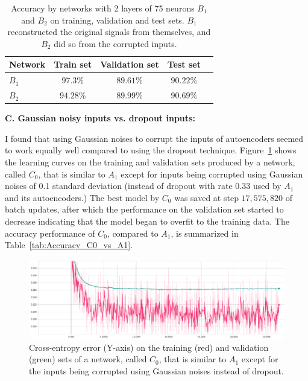 \documentclass[12pt]{article}
\begin{document}
\begin{table}
\begin{center}
\begin{tabular}{|l||c|c|c|l|}
\hline
Network & Train set & Validation set & Test set\\ \hline \hline
$B_1$ & $97.3\%$ & $89.61\%$ & $90.22\%$\\ \hline
$B_2$ & $94.28\%$ & $89.99\%$ & $90.69\%$\\ \hline
\end{tabular}
\caption{Accuracy by networks with 2 layers of 75 neurons $B_1$ and $B_2$ on training, validation and test sets. $B_1$ reconstructed the original signals from themselves, and $B_2$ did so from the corrupted inputs.}
\label{tab:Accuracy_B1_vs_B2}
\end{center}
\end{table}

\vspace{5mm}
\noindent
\textbf{C. Gaussian noisy inputs vs. dropout inputs:}

\noindent
I found that using Gaussian noises to corrupt the inputs of autoencoders seemed to work equally well compared to using the dropout technique. Figure~\ref{fig:stack_50_50_noise0.1_elu} shows the learning curves on the training and validation sets produced by a network, called $C_0$, that is similar to $A_1$ except for inputs being corrupted using Gaussian noises of 0.1 standard deviation (instead of dropout with rate $0.33$ used by $A_1$ and its autoencoders.) The best model by $C_0$ was saved at step $17,575,820$ of batch updates, after which the performance on the validation set started to decrease indicating that the model began to overfit to the training data. The accuracy performance of $C_0$, compared to $A_1$, is summarized in Table~\ref{tab:Accuracy_C0_vs_A1}.

\begin{figure}
  \includegraphics[width=\linewidth]{figures/stack_50_50_noise0.1_elu/learning_curves.eps}
  \caption{Cross-entropy error (Y-axis) on the training (red) and validation (green) sets of a network, called $C_0$, that is similar to $A_1$ except for the inputs being corrupted using Gaussian noises instead of dropout.}
  \label{fig:stack_50_50_noise0.1_elu}
\end{figure}
\end{document}
